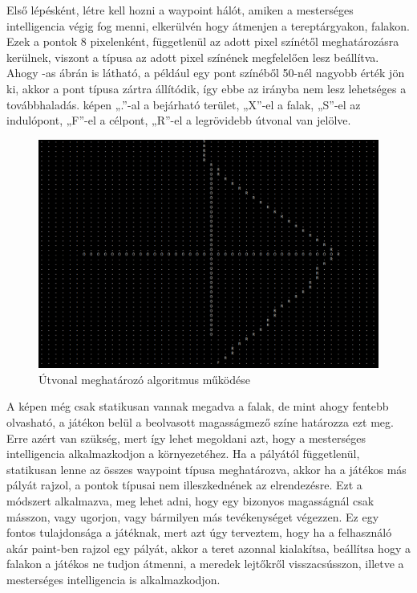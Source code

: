 Első lépésként, létre kell hozni a waypoint hálót, amiken a mesterséges intelligencia végig fog menni, elkerülvén hogy átmenjen a tereptárgyakon, falakon. Ezek a pontok 8 pixelenként, függetlenül az adott pixel színétől meghatározásra kerülnek, viszont a típusa az adott pixel színének megfelelően lesz beállítva. Ahogy -as ábrán is látható, a például egy pont színéből 50-nél nagyobb érték jön ki, akkor a pont típusa zártra állítódik, így ebbe az irányba nem lesz lehetséges a továbbhaladás.   képen „.”-al a bejárható terület, „X”-el a falak, „S”-el az indulópont, „F”-el a célpont, „R”-el a legrövidebb útvonal van jelölve.

\begin{figure}[h]
\centering
\includegraphics[scale=0.22]{kepek/mi_printscreen.png}
\caption{Útvonal meghatározó algoritmus működése}
\label{fig:mi_printscreen}
\end{figure}

A képen még csak statikusan vannak megadva a falak, de mint ahogy fentebb olvasható, a játékon belül a beolvasott magasságmező színe határozza ezt meg. Erre azért van szükség, mert így lehet megoldani azt, hogy a mesterséges intelligencia alkalmazkodjon a környezetéhez. Ha a pályától függetlenül, statikusan lenne az összes waypoint típusa meghatározva, akkor ha a játékos más pályát rajzol, a pontok típusai nem illeszkednének az elrendezésre. Ezt a módszert alkalmazva, meg lehet adni, hogy egy bizonyos magasságnál csak másszon, vagy ugorjon, vagy bármilyen más tevékenységet végezzen. Ez egy fontos tulajdonsága a játéknak, mert azt úgy terveztem, hogy ha a felhasználó akár paint-ben rajzol egy pályát, akkor a teret azonnal kialakítsa, beállítsa hogy a falakon a játékos ne tudjon átmenni, a meredek lejtőkről visszacsússzon, illetve a mesterséges intelligencia is alkalmazkodjon.

